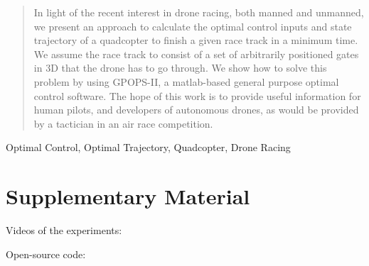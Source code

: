 \begin{abstract}
    In light of the recent interest in drone racing, both manned and unmanned, we present an approach to calculate the optimal control inputs and state trajectory of a quadcopter to finish a given race track in a minimum time.
    We assume the race track to consist of a set of arbitrarily positioned gates in 3D that the drone has to go through.
    We show how to solve this problem by using \textrm{GPOPS-II}, a matlab-based general purpose optimal control software.
    The hope of this work is to provide useful information for human pilots, and developers of autonomous drones, as would be provided by a tactician in an air race competition.
\end{abstract}

\begin{IEEEkeywords}
    Optimal Control, Optimal Trajectory, Quadcopter, Drone Racing
\end{IEEEkeywords}

\section*{Supplementary Material}
Videos of the experiments: 

Open-source code: 


